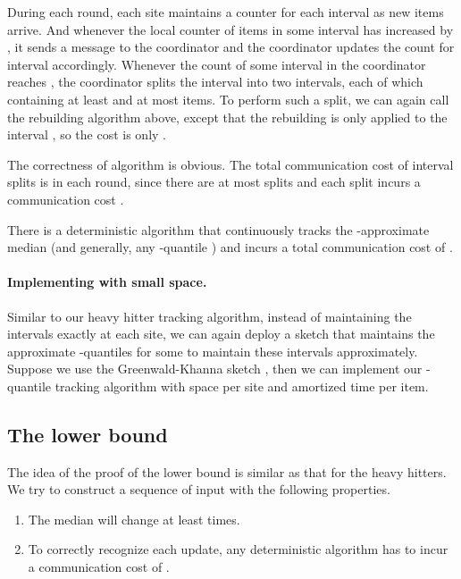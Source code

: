 \documentclass[10pt]{article}
\begin{document}
During each round, each site  maintains a counter for each interval as
new items arrive. And whenever the local counter of items in some interval
 has increased by , it sends a message to
the coordinator and the coordinator updates the count for interval 
accordingly.  Whenever the count of some interval in the coordinator 
reaches , the coordinator splits the interval into two
intervals, each of which containing at least  and at most
 items.  To perform such a split, we can again call the
rebuilding algorithm above, except that the rebuilding is only applied to
the interval , so the cost is only .

The correctness of algorithm is obvious. The total communication
cost of interval splits is  in each round, since
there are at most  splits and each split incurs a
communication cost .

\begin{theorem}
  There is a deterministic algorithm that continuously tracks the
  -approximate median (and generally, any -quantile ) and incurs a total communication cost of .
\end{theorem}

\paragraph{Implementing with small space.}
Similar to our heavy hitter tracking algorithm, instead of maintaining the
intervals exactly at each site, we can again deploy a sketch that maintains
the approximate -quantiles for some  to maintain
these intervals approximately.  Suppose we use the Greenwald-Khanna sketch
\cite{greenwald01:_space}, then we can implement our -quantile
tracking algorithm with  space per site and
amortized  time per item.

\subsection{The lower bound}


The idea of the proof of the lower bound is similar as that for
the heavy hitters. We try to construct a sequence of input with
the following properties.
\begin{enumerate}
\item The median will change at least  times.

\item To correctly recognize each update, any deterministic
algorithm has to incur a communication cost of .
\end{enumerate}
\end{document}
